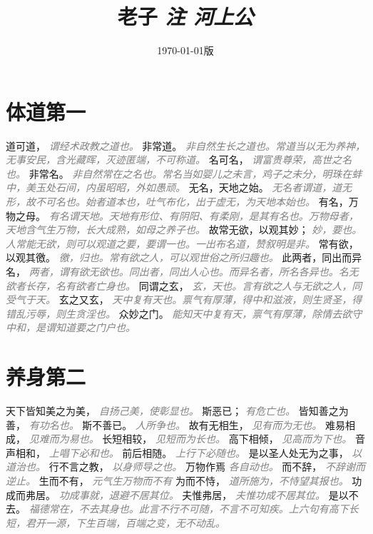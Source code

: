 \documentclass[a4paper,zihao=-4,oneside,landscape,UTF8]{ctexart}
\title{\textbf{老子}\textit{ 注 \hspace{5em}河上公}\hfil}
\author{}
\date{\normalsize\today 版}
\newcommand{\zhushi}[1]{\scriptsize{\textit{\textcolor{gray}{#1}}}\normalsize}
\begin{document}
\large

\maketitle


\section{体道第一}


道可道，
\zhushi{谓经术政教之道也。}
非常道。
\zhushi{非自然生长之道也。常道当以无为养神，无事安民，含光藏晖，灭迹匿端，不可称道。}
名可名，
\zhushi{谓富贵尊荣，高世之名也。}
非常名。
\zhushi{非自然常在之名也。常名当如婴儿之未言，鸡子之未分，明珠在蚌中，美玉处石间，内虽昭昭，外如愚顽。}
无名，天地之始。
\zhushi{无名者谓道，道无形，故不可名也。始者道本也，吐气布化，出于虚无，为天地本始也。}
有名，万物之母。
\zhushi{有名谓天地。天地有形位、有阴阳、有柔刚，是其有名也。万物母者，天地含气生万物，长大成熟，如母之养子也。}
故常无欲，以观其妙；
\zhushi{妙，要也。人常能无欲，则可以观道之要，要谓一也。一出布名道，赞叙明是非。}
常有欲，以观其徼。
\zhushi{徼，归也。常有欲之人，可以观世俗之所归趣也。}
此两者，同出而异名，
\zhushi{两者，谓有欲无欲也。同出者，同出人心也。而异名者，所名各异也。名无欲者长存，名有欲者亡身也。}
同谓之玄，
\zhushi{玄，天也。言有欲之人与无欲之人，同受气于天。}
玄之又玄，
\zhushi{天中复有天也。禀气有厚薄，得中和滋液，则生贤圣，得错乱污辱，则生贪淫也。}
众妙之门。
\zhushi{能知天中复有天，禀气有厚薄，除情去欲守中和，是谓知道要之门户也。}


\section{养身第二}

天下皆知美之为美，
\zhushi{自扬己美，使彰显也。}
斯恶已；
\zhushi{有危亡也。}
皆知善之为善，
\zhushi{有功名也。}
斯不善已。
\zhushi{人所争也。}
故有无相生，
\zhushi{见有而为无也。}
难易相成，
\zhushi{见难而为易也。}
长短相较，
\zhushi{见短而为长也。}
高下相倾，
\zhushi{见高而为下也。}
音声相和，
\zhushi{上唱下必和也。}
前后相随。
\zhushi{上行下必随也。}
是以圣人处无为之事，
\zhushi{以道治也。}
行不言之教，
\zhushi{以身师导之也。}
万物作焉
\zhushi{各自动也。}
而不辞，
\zhushi{不辞谢而逆止。}
生而不有，
\zhushi{元气生万物而不有}
为而不恃，
\zhushi{道所施为，不恃望其报也。}
功成而弗居。
\zhushi{功成事就，退避不居其位。}
夫惟弗居，
\zhushi{夫惟功成不居其位。}
是以不去。
\zhushi{福德常在，不去其身也。此言不行不可随，不言不可知疾。上六句有高下长短，君开一源，下生百端，百端之变，无不动乱。}
\end{document}
